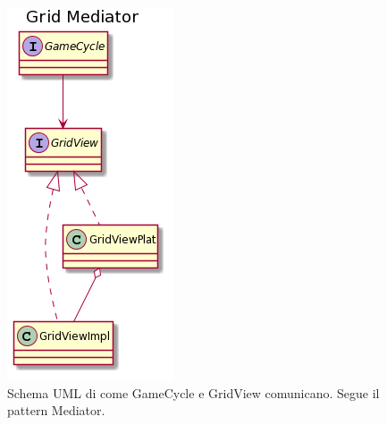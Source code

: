 \documentclass[a4paper,12pt]{report}
\begin{document}
\begin{figure}[!t]
\centering{}
\includegraphics[width=\textwidth]{images/miriana/grid_mediator.png}
\caption{Schema UML di come GameCycle e GridView comunicano. Segue il pattern Mediator.}
\label{img:gridmediator}
\end{figure}
\end{document}
